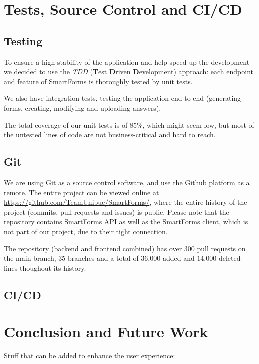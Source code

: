 \documentclass[12pt, a4paper]{report}
\begin{document}
\chapter{Tests, Source Control and CI/CD}

\section{Testing}

To ensure a high stability of the application and help speed up the development we decided to use the \textit{TDD} (\textbf{T}est \textbf{D}riven \textbf{D}evelopment) approach: each endpoint and feature of SmartForms is thoroughly tested by unit tests.

We also have integration tests, testing the application end-to-end (generating forms, creating, modifying and uploading answers).

The total coverage of our unit tests is of $85\%$, which might seem low, but most of the untested lines of code are not business-critical and hard to reach.

\section{Git}

We are using Git\cite{Git} as a source control software, and use the Github platform as a remote. The entire project can be viewed online at \url{https://github.com/TeamUnibuc/SmartForms/}, where the entire history of the project (commits, pull requests and issues) is public. Please note that the repository contains SmartForms API as well as the SmartForms client, which is not part of our project, due to their tight connection.

The repository (backend and frontend combined) has over $300$ pull requests on the main branch, $35$ branches and a total of $36.000$ added and $14.000$ deleted lines thoughout its history. 


\section{CI/CD}

\chapter{Conclusion and Future Work}

Stuff that can be added to enhance the user experience:
\end{document}
